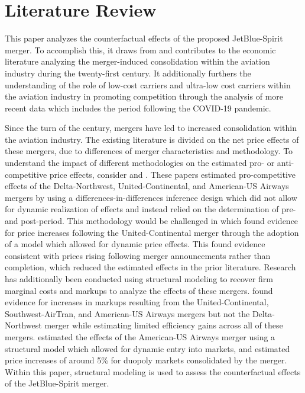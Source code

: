 \documentclass{article}
\begin{document}
	\section{Literature Review}
	\label{sec:Literature}

    This paper analyzes the counterfactual effects of the proposed JetBlue-Spirit merger. To accomplish this, it draws from and contributes to the economic literature analyzing the merger-induced consolidation within the aviation industry during the twenty-first century.  It additionally furthers the understanding of the role of low-cost carriers and ultra-low cost carriers within the aviation industry in promoting competition through the analysis of more recent data which includes the period following the COVID-19 pandemic.
	
	Since the turn of the century, mergers have led to increased consolidation within the aviation industry. The existing literature is divided on the net price effects of these mergers, due to differences of merger characteristics and methodology. To understand the impact of different methodologies on the estimated pro- or anti-competitive price effects, consider \citet{luo_price_2014} and \citet{carlton_are_2019}. These papers estimated pro-competitive effects of the Delta-Northwest, United-Continental, and American-US Airways mergers by using a differences-in-differences inference design which did not allow for dynamic realization of effects and instead relied on the determination of pre- and post-period. This methodology would be challenged in \citet{fan_when_2020} which found evidence for price increases following the United-Continental merger through the adoption of a model which allowed for dynamic price effects. This found evidence consistent with prices rising following merger announcements rather than completion, which reduced the estimated effects in the prior literature. Research has additionally been conducted using structural modeling to recover firm marginal costs and markups to analyze the effects of these mergers. \citet{bet_retrospective_2021} found evidence for increases in markups resulting from the United-Continental, Southwest-AirTran, and American-US Airways mergers but not the Delta-Northwest merger while estimating limited efficiency gains across all of these mergers. \citet{ciliberto_market_2021} estimated the effects of the American-US Airways merger using a structural model which allowed for dynamic entry into markets, and estimated price increases of around 5\% for duopoly markets consolidated by the merger. Within this paper, structural modeling is used to assess the counterfactual effects of the JetBlue-Spirit merger. 
\end{document}
